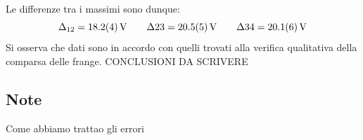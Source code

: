 	Le differenze tra i massimi sono dunque:
	$$\Delta_{12}=\SI{18.2\pm 0.4}{\volt} \qquad \Delta{23}=\SI{20.5 \pm 0.5}{\volt} \qquad \Delta{34}=\SI{20.1 \pm 0.6}{\volt}$$
	Si osserva che dati sono in accordo con quelli trovati alla 
	verifica qualitativa della comparsa delle frange.
	CONCLUSIONI DA SCRIVERE
	
\subsection{Note}
Come abbiamo trattao gli errori



